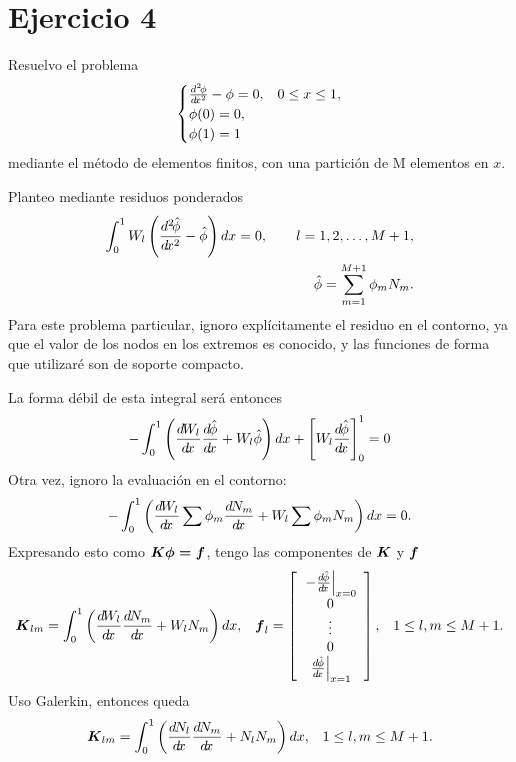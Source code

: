 \documentclass[a4paper,11pt,oneside]{article}
\begin{document}
\maketitle
%
\section*{Ejercicio 4}
%
Resuelvo el problema
\begin{align*}
  \begin{cases}
    \frac{d^{2}\!\phi}{d\!x^{2}}-\phi=0, & 0\leq x\leq 1,\\
    \phi(0)=0,\\
    \phi(1)=1
  \end{cases}
\end{align*}
mediante el método de elementos finitos, con una partición de M elementos en $x$.

Planteo mediante residuos ponderados
\begin{align*}
  \int_0^1 W_l \left( \frac{d^{2}\!\hat{\phi}}{d\!x^{2}}-\hat{\phi} \right)dx=0,\qquad l=1,2,\ldots,M+1,\\
  \hat{\phi} = \sum_{m=1}^{M+1}\phi_m N_m.
\end{align*}
%
  Para este problema particular, ignoro explícitamente el residuo en el contorno, ya
  que el valor de los nodos en los extremos es conocido, y las funciones de forma
  que utilizaré son de soporte compacto.
%

La forma débil de esta integral será entonces
\begin{align*}
  -\int_0^1 \left(\frac{d^{}\!W_l}{d\!x^{}}\frac{d^{}\!\hat{\phi}}{d\!x^{}}+W_l\hat{\phi}\right)dx + \left[W_l\frac{d^{}\!\hat{\phi}}{d\!x^{}}\right]_0^1=0
\end{align*}
Otra vez, ignoro la evaluación en el contorno:
\begin{align*}
  -\int_0^1 \left(\frac{d^{}\!W_l}{d\!x^{}}{}\sum\phi_m\frac{d^{}\!N_m}{d\!x^{}}+W_l\sum\phi_mN_m\right)dx=0.
\end{align*}
%
Expresando esto como $\boldsymbol{K\phi=f}$, tengo las componentes de $\boldsymbol{K}$ y $\boldsymbol{f}$
\begin{align*}
  \B{K}_{lm}&=\int_0^1 \left(\dx{W_l}{}{}\dx{N_m}{}+W_lN_m\right)dx, &
  \B{f}_{l}&=\left[
    \begin{array}{c}
      \left.-\dx{\hfi}{}\right|_{x=0}\\0\\\vdots\\0\\\left.\dx{\hfi}{}\right|_{x=1}
    \end{array}
    \right],&1\leq l,m\leq M+1.
\end{align*}
Uso Galerkin, entonces queda
\begin{align*}
  \boldsymbol{K}_{lm}&=\int_0^1 \left(\frac{d^{}\!N_l}{d\!x^{}}{}\frac{d^{}\!N_m}{d\!x^{}}+N_lN_m\right)dx, &1\leq l,m\leq M+1.
\end{align*}
%
%
\end{document}
